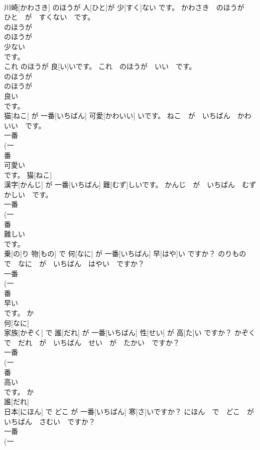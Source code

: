 \documentclass[8pt]{extreport}
\begin{document}
\begin{CJK}{UTF8}{min}
\\	川崎[かわさき] のほうが 人[ひと]が 少[すく]ない です。	かわさき　のほうが　ひと　が　すくない　です。	
\\	のほうが 
\\	のほうが 
\\	少ない 
\\	です。	
\\	これ のほうが 良[い]いです。	これ　のほうが　いい　です。	
\\	のほうが 
\\	のほうが 
\\	良い 
\\	です。	
\\	猫[ねこ] が 一番[いちばん] 可愛[かわいい] いです。	ねこ　が　いちばん　かわいい　です。	
\\	一番 
\\	(一 
\\	番 
\\	可愛い 
\\	です。	猫[ねこ] 
\\	漢字[かんじ] が 一番[いちばん] 難[むず]しいです。	かんじ　が　いちばん　むずかしい　です。	
\\	一番 
\\	(一 
\\	番 
\\	難しい 
\\	です。			
\\	乗[の]り 物[もの] で 何[なに] が 一番[いちばん] 早[はや]い ですか？	のりもの　で　なに　が　いちばん　はやい　ですか？	
\\	一番 
\\	(一 
\\	番 
\\	早い 
\\	です。	か 
\\	何[なに] 
\\	家族[かぞく] で 誰[だれ] が 一番[いちばん] 性[せい] が 高[た]い ですか？	かぞく　で　だれ　が　いちばん　せい　が　たかい　ですか？	
\\	一番 
\\	(一 
\\	番 
\\	高い 
\\	です。	か 
\\	誰[だれ] 
\\	日本[にほん] で どこ が 一番[いちばん] 寒[さ]いですか？	にほん　で　どこ　が　いちばん　さむい　ですか？	
\\	一番 
\\	(一 

\end{CJK}
\end{document}
